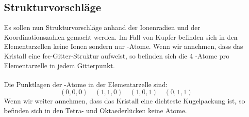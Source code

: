\documentclass[a4paper,titlepage]{scrartcl}
\numberwithin{equation}{section}
\begin{document}
\subsection{Strukturvorschläge}
Es sollen nun Strukturvorschläge anhand der Ionenradien und der Koordinationszahlen gemacht werden. Im Fall von Kupfer befinden sich in den Elementarzellen keine Ionen sondern nur -Atome. Wenn wir annehmen, dass das Kristall eine fcc-Gitter-Struktur aufweist, so befinden sich die 4 -Atome pro Elementarzelle in jedem Gitterpunkt.\\ \\
Die Punktlagen der -Atome in der Elementarzelle sind:
\begin{equation*}
(0,0,0) \quad (1, 1, 0) \quad (1,0,1) \quad (0,1, 1)
\end{equation*}
Wenn wir weiter annehmen, dass das Kristall eine dichteste Kugelpackung ist, so befinden sich in den Tetra- und Oktaederlücken keine Atome.
\end{document}
